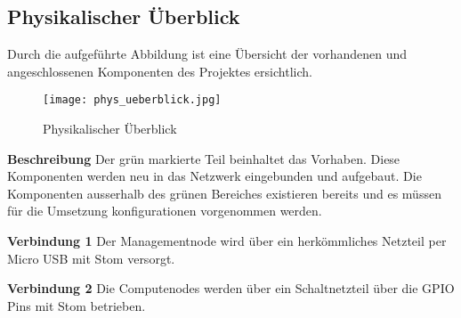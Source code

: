 \subsection{Physikalischer Überblick}
Durch die aufgeführte Abbildung ist eine Übersicht der vorhandenen und angeschlossenen Komponenten des Projektes ersichtlich.

\begin{figure}[htb]
\centering
\texttt{[image: phys\_ueberblick.jpg]}
\caption{Physikalischer Überblick}
\label{fig:Physikalischer Überblick}
\end{figure} 

\textbf{Beschreibung}\newline
Der grün markierte Teil beinhaltet das Vorhaben. Diese Komponenten werden neu in das Netzwerk eingebunden und aufgebaut. Die Komponenten ausserhalb des grünen Bereiches existieren bereits und es müssen für die Umsetzung konfigurationen vorgenommen werden.

\textbf{Verbindung 1} \newline
Der Managementnode wird über ein herkömmliches Netzteil per Micro USB mit Stom versorgt.

\textbf{Verbindung 2} \newline
Die Computenodes werden über ein Schaltnetzteil über die GPIO Pins mit Stom betrieben.


